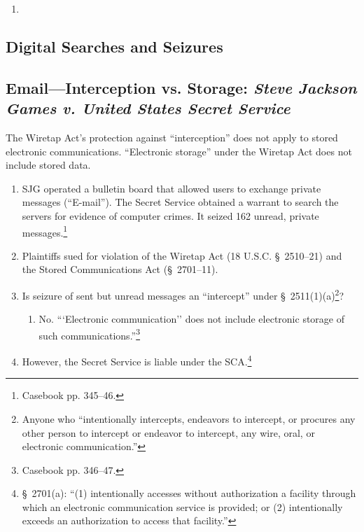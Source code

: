 \begin{enumerate}
    \item %
\end{enumerate}

\subsection{Digital Searches and Seizures}

\subsection{Email---Interception vs. Storage: \emph{Steve Jackson Games v. 
United States Secret Service}}

The Wiretap Act's protection against ``interception'' does not apply to 
stored electronic communications. ``Electronic storage'' under the Wiretap Act 
does not include stored data.

\begin{enumerate}
    \item SJG operated a bulletin board that allowed users to exchange private 
    messages (``E-mail''). The Secret Service obtained a warrant to search the 
    servers for evidence of computer crimes. It seized 162 unread, private 
    messages.\footnote{Casebook pp. 345--46.}
    \item Plaintiffs sued for violation of the Wiretap Act (18 U.S.C. \S\ 
    2510--21) and the Stored Communications Act (\S\ 2701--11).
    \item Is seizure of sent but unread messages an ``intercept'' under \S\ 
    2511(1)(a)\footnote{Anyone who ``intentionally intercepts, endeavors to 
    intercept, or procures any other person to intercept or endeavor to 
    intercept, any wire, oral, or electronic communication.''}?
    \begin{enumerate}
        \item No. ```Electronic communication'' does not include electronic 
        storage of such communications.''\footnote{Casebook pp. 346--47.}
    \end{enumerate}
    \item However, the Secret Service is liable under the SCA.\footnote{\S\ 
    2701(a): ``(1) intentionally accesses without authorization a facility 
    through which an electronic communication service is provided; or (2) 
    intentionally exceeds an authorization to access that facility.''}
\end{enumerate}

